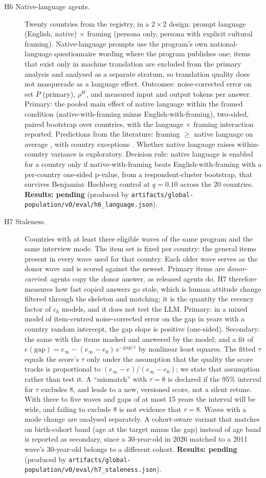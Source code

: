 \documentclass[10pt]{article}
\newcommand{\pending}[1]{\textbf{Results: pending} (produced by \nolinkurl{#1})}
\begin{document}
\begin{description}
  \item[H6 Native-language agents.] Twenty countries from the registry, in a $2\times2$ design: prompt language (English, native) $\times$ framing (persona only, persona with explicit cultural framing). Native-language prompts use the program's own national-language questionnaire wording where the program publishes one; items that exist only in machine translation are excluded from the primary analysis and analysed as a separate stratum, so translation quality does not masquerade as a language effect. Outcomes: noise-corrected error on set $P$ (primary), $\rho^W$, and measured input and output tokens per answer. Primary: the pooled main effect of native language within the framed condition (native-with-framing minus English-with-framing), two-sided, paired bootstrap over countries, with the language $\times$ framing interaction reported. Predictions from the literature: framing $\geq$ native language on average \citep{bulte2026,kwok2024}, with country exceptions \citep{alkhamissi2024}. Whether native language raises within-country variance is exploratory. Decision rule: native language is enabled for a country only if native-with-framing beats English-with-framing with a per-country one-sided p-value, from a respondent-cluster bootstrap, that survives Benjamini--Hochberg control at $q = 0.10$ across the 20 countries. \pending{artifacts/global-population/v0/eval/h6_language.json}.
  \item[H7 Staleness.] Countries with at least three eligible waves of the same program and the same interview mode. The item set is fixed per country: the general items present in every wave used for that country. Each older wave serves as the donor wave and is scored against the newest. Primary items are \emph{donor-carried}: agents copy the donor answer, as released agents do. H7 therefore measures how fast copied answers go stale, which is human attitude change filtered through the skeleton and matching; it is the quantity the recency factor of $c_k$ models, and it does not test the LLM. Primary: in a mixed model of item-centred noise-corrected error on the gap in years with a country random intercept, the gap slope is positive (one-sided). Secondary: the same with the items masked and answered by the model; and a fit of $e(\text{gap}) = e_\infty - (e_\infty - e_0)\,e^{-\text{gap}/\tau}$ by nonlinear least squares. The fitted $\tau$ equals the score's $\tau$ only under the assumption that the quality the score tracks is proportional to $(e_\infty - e)/(e_\infty - e_0)$; we state that assumption rather than test it. A ``mismatch'' with $\tau = 8$ is declared if the 95\% interval for $\tau$ excludes 8, and leads to a new, versioned score, not a silent retune. With three to five waves and gaps of at most 15 years the interval will be wide, and failing to exclude 8 is not evidence that $\tau = 8$. Waves with a mode change are analysed separately. A cohort-aware variant that matches on birth-cohort band (age at the target minus the gap) instead of age band is reported as secondary, since a 30-year-old in 2026 matched to a 2011 wave's 30-year-old belongs to a different cohort. \pending{artifacts/global-population/v0/eval/h7_staleness.json}.

\end{description}
\end{document}
